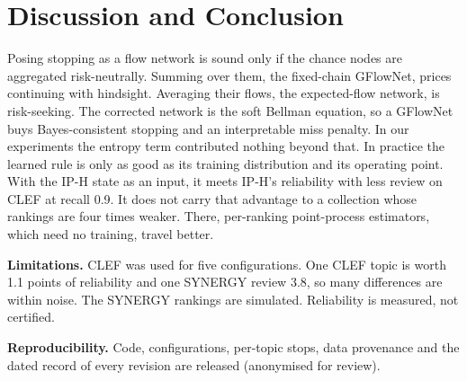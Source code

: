 \documentclass[sigconf,review,anonymous]{acmart}
\begin{document}
\section{Discussion and Conclusion}

Posing stopping as a flow network is sound only if the chance nodes are aggregated risk-neutrally. Summing over them, the fixed-chain GFlowNet, prices continuing with hindsight. Averaging their flows, the expected-flow network, is risk-seeking. The corrected network is the soft Bellman equation, so a GFlowNet buys Bayes-consistent stopping and an interpretable miss penalty. In our experiments the entropy term contributed nothing beyond that. In practice the learned rule is only as good as its training distribution and its operating point. With the IP-H state as an input, it meets IP-H's reliability with less review on CLEF at recall 0.9. It does not carry that advantage to a collection whose rankings are four times weaker. There, per-ranking point-process estimators, which need no training, travel better.

\textbf{Limitations.} CLEF was used for five configurations. One CLEF topic is worth 1.1 points of reliability and one SYNERGY review 3.8, so many differences are within noise. The SYNERGY rankings are simulated. Reliability is measured, not certified.

\textbf{Reproducibility.} Code, configurations, per-topic stops, data provenance and the dated record of every revision are released (anonymised for review).



\end{document}
